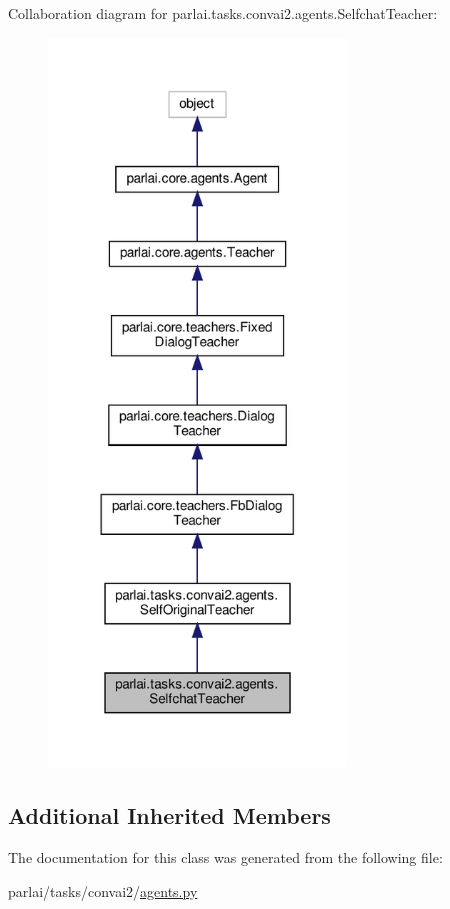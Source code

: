Collaboration diagram for parlai.\+tasks.\+convai2.\+agents.\+Selfchat\+Teacher\+:
\nopagebreak
\begin{figure}[H]
\begin{center}
\leavevmode
\includegraphics[width=224pt]{classparlai_1_1tasks_1_1convai2_1_1agents_1_1SelfchatTeacher__coll__graph}
\end{center}
\end{figure}
\subsection*{Additional Inherited Members}


The documentation for this class was generated from the following file\+:\begin{DoxyCompactItemize}
\item 
parlai/tasks/convai2/\hyperlink{parlai_2tasks_2convai2_2agents_8py}{agents.\+py}\end{DoxyCompactItemize}
